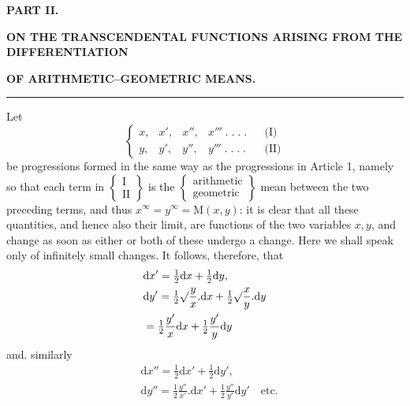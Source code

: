 \begingroup
\renewcommand{\arraystretch}{1.45}
\clearpage{}
\begin{center}
\textbf{PART II.}\par
\textbf{ON THE TRANSCENDENTAL FUNCTIONS ARISING FROM THE DIFFERENTIATION}\par
\textbf{OF ARITHMETIC–GEOMETRIC MEANS.}
\end{center}
\par\begin{center}\rule{.15\linewidth}{.4pt}\end{center}
Let
\[
\left\{\begin{array}{llllll}
x,&x',&x'',&x'''\; .\; .\; .\; .&&\text{(I)}\\[6pt]
y,&y',&y'',&y'''\; .\; .\; .\; .&&\text{(II)}
\end{array}\right.
\]
be progressions formed in the same way as the progressions in Article 1, namely so that each term in
$\left\{\begin{array}{c}\mathrm{I}\\\mathrm{II}\end{array}\right\}$ is the
$\left\{\begin{array}{c}\text{arithmetic}\\\text{geometric}\end{array}\right\}$
mean between the two preceding terms, and thus $x^{\infty}=y^{\infty}=\mathrm{M}(x,y)$:
it is clear that all these quantities, and hence also their limit, are functions
of the two variables $x,y$, and change as soon as either or both of these
undergo a change. Here we shall speak only of infinitely small changes.
It follows, therefore, that
\[
\begin{aligned}&\mathrm{d}x'=\tfrac12\mathrm{d}x+\tfrac12\mathrm{d}y,\\&
\mathrm{d}y'=\tfrac12\surd\frac{y}{x}. \mathrm{d}x
+\tfrac12\surd\frac{x}{y}. \mathrm{d}y\\&=\tfrac12\frac{y'}{x}\mathrm{d}x+\tfrac12\frac{y'}{y}\mathrm{d}y\end{aligned}
\]
and. similarly
\[
\begin{aligned}&\mathrm{d}x''=\tfrac12\mathrm{d}x'+\tfrac12\mathrm{d}y',\\&
\mathrm{d}y''=\tfrac12\frac{y''}{x'}. \mathrm{d}x'
+\tfrac12\frac{y''}{y'}\mathrm{d}y'\quad\text{etc.}\end{aligned}
\]
